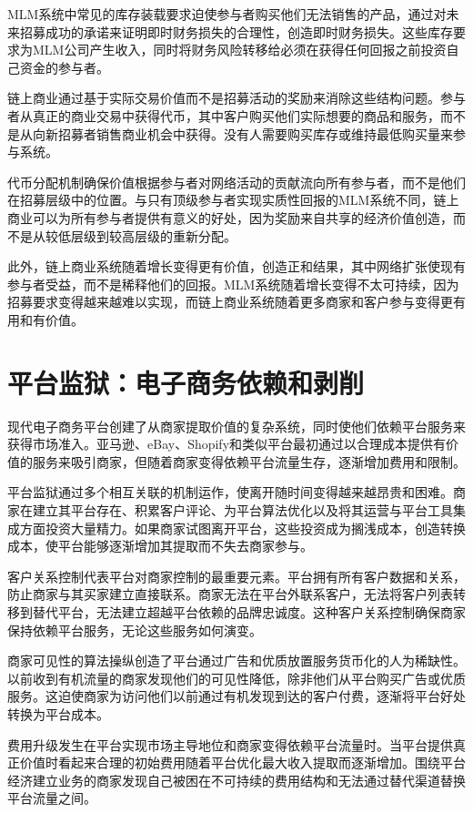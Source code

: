 \documentclass[
  Letterpaper,
]{scrbook}
\begin{document}
MLM系统中常见的库存装载要求迫使参与者购买他们无法销售的产品，通过对未来招募成功的承诺来证明即时财务损失的合理性，创造即时财务损失。这些库存要求为MLM公司产生收入，同时将财务风险转移给必须在获得任何回报之前投资自己资金的参与者。

链上商业通过基于实际交易价值而不是招募活动的奖励来消除这些结构问题。参与者从真正的商业交易中获得代币，其中客户购买他们实际想要的商品和服务，而不是从向新招募者销售商业机会中获得。没有人需要购买库存或维持最低购买量来参与系统。

代币分配机制确保价值根据参与者对网络活动的贡献流向所有参与者，而不是他们在招募层级中的位置。与只有顶级参与者实现实质性回报的MLM系统不同，链上商业可以为所有参与者提供有意义的好处，因为奖励来自共享的经济价值创造，而不是从较低层级到较高层级的重新分配。

此外，链上商业系统随着增长变得更有价值，创造正和结果，其中网络扩张使现有参与者受益，而不是稀释他们的回报。MLM系统随着增长变得不太可持续，因为招募要求变得越来越难以实现，而链上商业系统随着更多商家和客户参与变得更有用和有价值。

\section{平台监狱：电子商务依赖和剥削}\label{ux5e73ux53f0ux76d1ux72f1ux7535ux5b50ux5546ux52a1ux4f9dux8d56ux548cux5265ux524a}

现代电子商务平台创建了从商家提取价值的复杂系统，同时使他们依赖平台服务来获得市场准入。亚马逊、eBay、Shopify和类似平台最初通过以合理成本提供有价值的服务来吸引商家，但随着商家变得依赖平台流量生存，逐渐增加费用和限制。

平台监狱通过多个相互关联的机制运作，使离开随时间变得越来越昂贵和困难。商家在建立其平台存在、积累客户评论、为平台算法优化以及将其运营与平台工具集成方面投资大量精力。如果商家试图离开平台，这些投资成为搁浅成本，创造转换成本，使平台能够逐渐增加其提取而不失去商家参与。

客户关系控制代表平台对商家控制的最重要元素。平台拥有所有客户数据和关系，防止商家与其买家建立直接联系。商家无法在平台外联系客户，无法将客户列表转移到替代平台，无法建立超越平台依赖的品牌忠诚度。这种客户关系控制确保商家保持依赖平台服务，无论这些服务如何演变。

商家可见性的算法操纵创造了平台通过广告和优质放置服务货币化的人为稀缺性。以前收到有机流量的商家发现他们的可见性降低，除非他们从平台购买广告或优质服务。这迫使商家为访问他们以前通过有机发现到达的客户付费，逐渐将平台好处转换为平台成本。

费用升级发生在平台实现市场主导地位和商家变得依赖平台流量时。当平台提供真正价值时看起来合理的初始费用随着平台优化最大收入提取而逐渐增加。围绕平台经济建立业务的商家发现自己被困在不可持续的费用结构和无法通过替代渠道替换平台流量之间。
\end{document}
